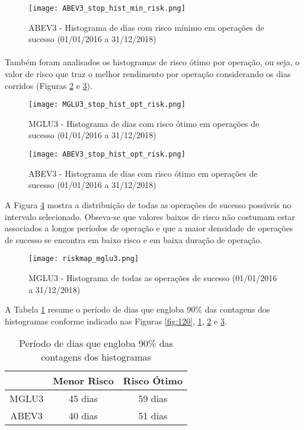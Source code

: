 \begin{figure}[!htb]
    \texttt{[image: ABEV3\_stop\_hist\_min\_risk.png]}
    \centering
    \caption{ABEV3 - Histograma de dias com risco mínimo em operações de sucesso (01/01/2016 a 31/12/2018)}
    \label{fig:121}
\end{figure}

\paragraph{} Também foram analisados os histogramas de risco ótimo por operação, ou seja, o valor de risco que traz o melhor rendimento por operação considerando os dias corridos (Figuras \ref{fig:122} e \ref{fig:123}).

\begin{figure}[!htb]
    \texttt{[image: MGLU3\_stop\_hist\_opt\_risk.png]}
    \centering
    \caption{MGLU3 - Histograma de dias com risco ótimo em operações de sucesso (01/01/2016 a 31/12/2018)}
    \label{fig:122}
\end{figure}

\begin{figure}[!htb]
    \texttt{[image: ABEV3\_stop\_hist\_opt\_risk.png]}
    \centering
    \caption{ABEV3 - Histograma de dias com risco ótimo em operações de sucesso (01/01/2016 a 31/12/2018)}
    \label{fig:123}
\end{figure}

A Figura \ref{fig:540} mostra a distribuição de todas as operações de sucesso possíveis no intervalo selecionado. Obseva-se que valores baixos de risco não costumam estar associados a longos períodos de operação e que a maior densidade de operações de sucesso se encontra em baixo risco e em baixa duração de operação.

\begin{figure}[!htb]
    \texttt{[image: riskmap\_mglu3.png]}
    \centering
    \caption{MGLU3 - Histograma de todas as operações de sucesso (01/01/2016 a 31/12/2018)}
    \label{fig:540}
\end{figure}

A Tabela \ref{tab:4} resume o período de dias que engloba 90\% das contagens dos histogramas conforme indicado nas Figuras \ref{fig:120}, \ref{fig:121}, \ref{fig:122} e \ref{fig:123}.

\begin{table}[h!]
    \begin{center}
        \begin{tabular}{ c|cc }
            & Menor Risco & Risco Ótimo \\
            \hline
            MGLU3 & 45 dias & 59 dias \\
            ABEV3 & 40 dias & 51 dias \\
        \end{tabular}
        \caption{Período de dias que engloba 90\% das contagens dos histogramas}
        \label{tab:4}
    \end{center}
\end{table}

